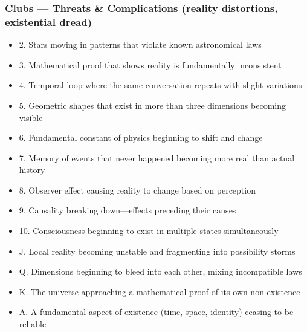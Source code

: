 \documentclass[11pt]{article}
\begin{document}
\subsubsection{Clubs — Threats \& Complications (reality distortions, existential dread)}
\begin{itemize}[leftmargin=*]
\item 2. Stars moving in patterns that violate known astronomical laws
\item 3. Mathematical proof that shows reality is fundamentally inconsistent
\item 4. Temporal loop where the same conversation repeats with slight variations
\item 5. Geometric shapes that exist in more than three dimensions becoming visible
\item 6. Fundamental constant of physics beginning to shift and change
\item 7. Memory of events that never happened becoming more real than actual history
\item 8. Observer effect causing reality to change based on perception
\item 9. Causality breaking down—effects preceding their causes
\item 10. Consciousness beginning to exist in multiple states simultaneously
\item J. Local reality becoming unstable and fragmenting into possibility storms
\item Q. Dimensions beginning to bleed into each other, mixing incompatible laws
\item K. The universe approaching a mathematical proof of its own non-existence
\item A. A fundamental aspect of existence (time, space, identity) ceasing to be reliable
\end{itemize}
\end{document}
